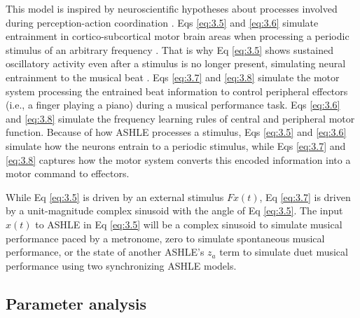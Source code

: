 \documentclass{report}
\begin{document}
This model is inspired by neuroscientific hypotheses about processes involved during perception-action coordination \cite{large2015neural}. Eqs \eqref{eq:3.5} and \eqref{eq:3.6} simulate entrainment in cortico-subcortical motor brain areas when processing a periodic stimulus of an arbitrary frequency \cite{daly2014changes, grahn2009feeling, grahn2013finding}. That is why Eq \eqref{eq:3.5} shows sustained oscillatory activity even after a stimulus is no longer present, simulating neural entrainment to the musical beat \cite{large2015neural}. Eqs \eqref{eq:3.7} and \eqref{eq:3.8} simulate the motor system processing the entrained beat information to control peripheral effectors (i.e., a finger playing a piano) during a musical performance task. Eqs \eqref{eq:3.6} and \eqref{eq:3.8} simulate the frequency learning rules of central and peripheral motor function. Because of how ASHLE processes a stimulus, Eqs \eqref{eq:3.5} and \eqref{eq:3.6} simulate how the neurons entrain to a periodic stimulus, while Eqs \eqref{eq:3.7} and \eqref{eq:3.8} captures how the motor system converts this encoded information into a motor command to effectors.

While Eq \eqref{eq:3.5} is driven by an external stimulus $Fx(t)$, Eq \eqref{eq:3.7} is driven by a unit-magnitude complex sinusoid with the angle of Eq \eqref{eq:3.5}. The input $x(t)$ to ASHLE in Eq \eqref{eq:3.5} will be a complex sinusoid to simulate musical performance paced by a metronome, zero to simulate spontaneous musical performance, or the state of another ASHLE's $z_a$ term to simulate duet musical performance using two synchronizing ASHLE models.

\subsection{Parameter analysis}
\end{document}
